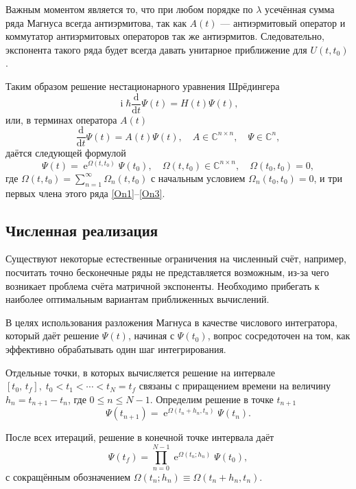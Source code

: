 \documentclass[12pt]{article}
\DeclareMathOperator{\Exp}{e}
\DeclareMathOperator\Iunit{i}
\renewcommand\exp\Exp
\renewcommand\imath\Iunit
\begin{document}
Важным моментом является то, что при любом порядке по $\lambda $ усечённая сумма
ряда Магнуса всегда антиэрмитова, так как $A(t)$ — антиэрмитовый оператор и
коммутатор антиэрмитовых операторов так же антиэрмитов. Следовательно,
экспонента такого ряда будет всегда давать унитарное приближение для $U(t,t_0)$.

Таким образом решение нестационарного уравнения Шрёдингера 
\begin{equation}
  \imath\hbar\frac{\text{d}}{\text{d}t}\Psi(t)=H(t)\Psi(t),
\end{equation}
или, в терминах оператора $A(t)$
\begin{equation}\label{dPsi}
  \frac{\text{d}}{\text{d} t}\Psi(t)=A(t)\Psi(t), \quad
  A \in \mathbb{C}^{n\times n}, \quad
  \Psi \in \mathbb{C}^n,
\end{equation}
даётся следующей формулой
\begin{equation}
  \Psi(t)=\exp^{\Omega(t,t_0)}\Psi(t_0), \quad
  \Omega(t,t_0) \in \mathbb{C}^{n\times n}, \quad
  \Omega(t_0,t_0)=0,
\end{equation}
где $\Omega(t,t_0)=\sum\limits_{n=1}^\infty\Omega_n(t,t_0)$ с начальным условием
$\Omega_n(t_0,t_0)=0$, и три первых члена этого ряда \eqref{On1}–\eqref{On3}.

\subsection{Численная реализация}

Существуют некоторые естественные ограничения на численный счёт, например,
посчитать точно бесконечные ряды не представляется возможным, из-за чего
возникает проблема счёта матричной экспоненты. Необходимо прибегать к наиболее
оптимальным вариантам приближенных вычислений.

В целях использования разложения Магнуса в качестве числового интегратора,
который даёт решение $\Psi(t)$, начиная с $\Psi(t_0)$, вопрос сосредоточен на
том, как эффективно обрабатывать один шаг интегрирования.

Отдельные точки, в которых вычисляется решение на интервале
$[t_0,\,t_f], \;t_0 < t_1 < \cdots < t_N = t_f$ связаны с приращением времени
на величину $h_n=t_{n+1}-t_n$, где $0\leqslant n \leqslant N-1$. Определим
решение в точке $t_{n+1}$
\begin{equation}
  \Psi(t_{n+1})=\exp^{\Omega(t_n+h_n,t_n)}\Psi(t_n).
\end{equation}

После всех итераций, решение в конечной точке интервала даёт
\begin{equation}
  \Psi(t_f)=\prod_{n=0}^{N-1} \exp^{\Omega(t_n;h_n)}\Psi(t_0),
\end{equation}
с сокращённым обозначением $\Omega(t_n;h_n)\equiv \Omega(t_n + h_n,t_n)$.
\end{document}
